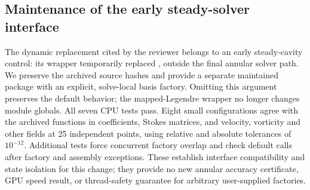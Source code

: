 \subsection{Maintenance of the early steady-solver interface}
The dynamic replacement cited by the reviewer belongs to an early steady-cavity
control: its wrapper temporarily replaced
, outside the final annular solver path.
We preserve the archived source hashes and provide a separate maintained package
with an explicit, solve-local basis factory. Omitting this argument preserves the
default behavior; the mapped-Legendre wrapper no longer changes module globals.
All seven CPU tests pass. Eight small configurations agree with the archived
functions in coefficients, Stokes matrices, and velocity, vorticity and other fields
at 25 independent points, using relative and absolute tolerances of $10^{-12}$.
Additional tests force concurrent factory overlap and check default calls after
factory and assembly exceptions. These establish interface compatibility and
state isolation for this change; they provide no new annular accuracy certificate,
GPU speed result, or thread-safety guarantee for arbitrary user-supplied factories.
